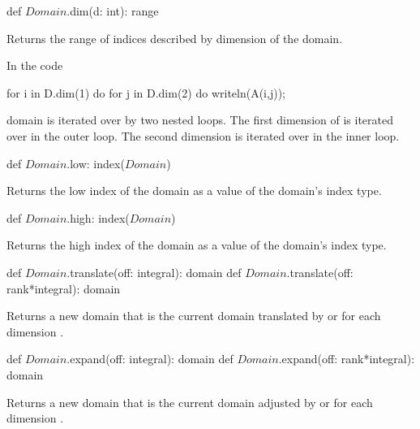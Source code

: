 \begin{protohead}
def $Domain$.dim(d: int): range
\end{protohead}
\begin{protobody}
Returns the range of indices described by dimension  of the
domain.
\end{protobody}

\begin{example}
In the code
\begin{chapel}
for i in D.dim(1) do
  for j in D.dim(2) do
    writeln(A(i,j));
\end{chapel}
domain  is iterated over by two nested loops.  The first
dimension of  is iterated over in the outer loop.  The second
dimension is iterated over in the inner loop.
\end{example}


\begin{protohead}
def $Domain$.low: index($Domain$)
\end{protohead}
\begin{protobody}
Returns the low index of the domain as a value of the domain's index
type.
\end{protobody}

\begin{protohead}
def $Domain$.high: index($Domain$)
\end{protohead}
\begin{protobody}
Returns the high index of the domain as a value of the domain's index
type.
\end{protobody}

\begin{protohead}
def $Domain$.translate(off: integral): domain
def $Domain$.translate(off: rank*integral): domain
\end{protohead}
\begin{protobody}
Returns a new domain that is the current domain translated
by  or  for each dimension .
\end{protobody}

\begin{protohead}
def $Domain$.expand(off: integral): domain
def $Domain$.expand(off: rank*integral): domain
\end{protohead}
\begin{protobody}
Returns a new domain that is the current domain adjusted by 
or  for each dimension .
\end{protobody}

